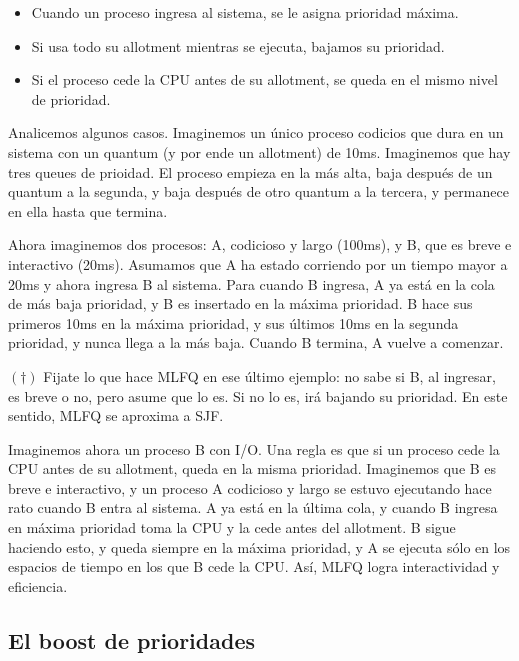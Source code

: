\documentclass[12pt]{article}
\theoremstyle{definition}
\begin{document}
\begin{itemize}
    \item Cuando un proceso ingresa al sistema, se le asigna prioridad máxima. 
    \item Si usa todo su allotment mientras se ejecuta, bajamos su prioridad. 
    \item Si el proceso cede la CPU antes de su allotment, se queda en el mismo
        nivel de prioridad.
\end{itemize}

Analicemos algunos casos. Imaginemos un único proceso codicios que dura en un
sistema con un quantum (y por ende un allotment) de 10ms. Imaginemos que hay
tres queues de prioidad. El proceso empieza en la más alta, baja después de un
quantum a la segunda, y baja después de otro quantum a la tercera, y permanece
en ella hasta que termina.

Ahora imaginemos dos procesos: A, codicioso y largo (100ms), y B, que es breve e
interactivo (20ms). Asumamos que A ha estado corriendo por un tiempo mayor a
20ms y ahora ingresa B al sistema. Para cuando B ingresa, A ya está
en la cola de más baja prioridad, y B es insertado en la máxima prioridad. B
hace sus primeros 10ms en la máxima prioridad, y sus últimos 10ms en la segunda
prioridad, y nunca llega a la más baja. Cuando B termina, A vuelve a comenzar.

\begin{shaded}
    $(\dagger)$ Fijate lo que hace MLFQ en ese último ejemplo: no sabe si B, al
    ingresar, es breve o no, pero asume que lo es. Si no lo es, irá bajando su
    prioridad. En este sentido, MLFQ se aproxima a SJF.
\end{shaded}

Imaginemos ahora un proceso B con I/O. Una regla es que si un proceso cede la
CPU antes de su allotment, queda en la misma prioridad. Imaginemos que B es
breve e interactivo, y un proceso A codicioso y largo se estuvo ejecutando hace
rato cuando B entra al sistema. A ya está en la última cola, y cuando B ingresa
en máxima prioridad toma la CPU y la cede antes del allotment. B sigue haciendo
esto, y queda siempre en la máxima prioridad, y A se ejecuta sólo en los
espacios de tiempo en los que B cede la CPU. Así, MLFQ logra interactividad y
eficiencia.


\subsection{El boost de prioridades}
\end{document}
